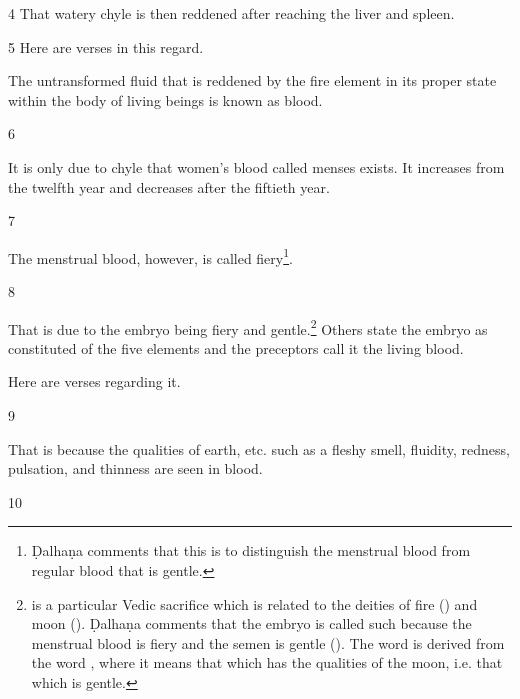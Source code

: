 \begin{translation}
\item [4]  
That watery chyle is then reddened after reaching the liver and spleen.

\item [5]
Here are verses in this regard.

\begin{sloka}
The untransformed fluid that is reddened by the fire element in its proper state within the body of living beings is known as blood. %
\end{sloka}

\item [6]

\begin{sloka}
It is only due to chyle that women's blood called menses exists. It increases from the twelfth year and decreases after the fiftieth year. 
\end{sloka}

\item [7]

The menstrual blood, however, is called fiery\footnote{Ḍalhaṇa comments that this is to distinguish the menstrual blood from regular blood that is gentle.}.  

\item [8]

That is due to the embryo being fiery and gentle.\footnote{ is a particular Vedic sacrifice which is related to the deities of fire () and moon (). Ḍalhaṇa comments that the embryo is called such because the menstrual blood is fiery and the semen is gentle (). The word  is derived from the word , where it means that which has the qualities of the moon, i.e. that which is gentle.}
Others state the embryo as constituted of the five elements and the preceptors call it the living blood. 

Here are verses regarding it.

\item [9]

\begin{sloka}
That is because the qualities of earth, etc. such as a fleshy smell, fluidity, redness, pulsation, and thinness are seen in blood.
\end{sloka}

\item [10]


\end{translation}

